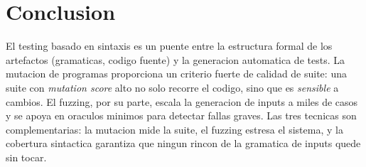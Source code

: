 \documentclass[12pt,a4paper]{article}
\begin{document}
\section*{Conclusion}

El testing basado en sintaxis es un puente entre la estructura formal de los artefactos
(gramaticas, codigo fuente) y la generacion automatica de tests. La mutacion de programas
proporciona un criterio fuerte de calidad de suite: una suite con \emph{mutation score} alto
no solo recorre el codigo, sino que es \emph{sensible} a cambios. El fuzzing, por su parte,
escala la generacion de inputs a miles de casos y se apoya en oraculos minimos para detectar
fallas graves. Las tres tecnicas son complementarias: la mutacion mide la suite, el fuzzing
estresa el sistema, y la cobertura sintactica garantiza que ningun rincon de la gramatica de
inputs quede sin tocar.
\end{document}
